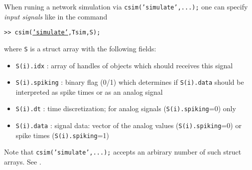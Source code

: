 

When runing a network simulation via \texttt{csim('simulate',...);}
one can specify \emph{input signals} like in the command
%
\begin{tabbing}
\quad\texttt{>> csim(\hyperlink{cmd:simulate}{'simulate'},Tsim,S);}
\end{tabbing}
%
where \texttt{S} is a struct array with the following fields:
%
\begin{itemize}
  
\item \texttt{S(i).idx} : array of handles of objects which should
  receives this signal

\item \texttt{S(i).spiking} : binary flag (0/1) which determines if
  \texttt{S(i).data} should be interpreted as spike times or as an
  analog signal
  
\item \texttt{S(i).dt} : time discretization; for analog signals
  (\texttt{S(i).spiking}=0) only
  
\item \texttt{S(i).data} : signal data: vector of the analog values
  (\texttt{S(i).spiking}=0) or spike times (\texttt{S(i).spiking}=1)

\end{itemize}
%
Note that \texttt{csim('simulate',...);} accepts an arbirary number of
such struct arrays. See .


%
%
%
%


